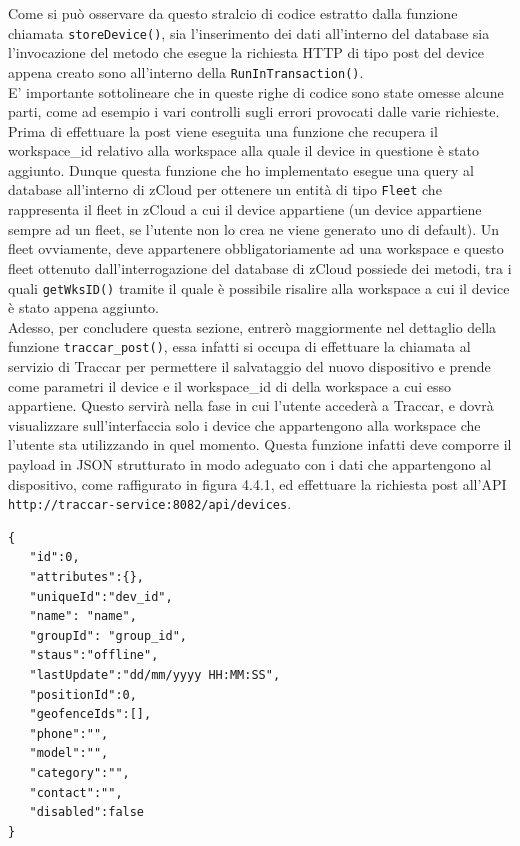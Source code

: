 \documentclass[a4paper,titlepage,12pt]{report}
\begin{document}
{\begin{verbatim}
\end{verbatim}


\noindent Come si può osservare da questo stralcio di codice estratto dalla funzione chiamata \texttt{storeDevice()}, sia l'inserimento dei dati all'interno del database sia l'invocazione del metodo che esegue la richiesta HTTP di tipo post del device appena creato sono all'interno della \texttt{RunInTransaction()}.\\
E' importante sottolineare che in queste righe di codice sono state omesse alcune parti, come ad esempio i vari controlli sugli errori provocati dalle varie richieste.\\
Prima di effettuare la post viene eseguita una funzione che recupera il workspace\_id relativo alla workspace alla quale il device in questione è stato aggiunto. Dunque questa funzione che ho implementato esegue una query al database all'interno di zCloud per ottenere un entità di tipo \texttt{Fleet} che rappresenta il fleet in zCloud a cui il device appartiene (un device appartiene sempre ad un fleet, se l'utente non lo crea ne viene generato uno di default). Un fleet ovviamente, deve appartenere obbligatoriamente ad una workspace e questo fleet ottenuto dall'interrogazione del database di zCloud possiede dei metodi, tra i quali \texttt{getWksID()} tramite il quale è possibile risalire alla workspace a cui il device è stato appena aggiunto.\\
Adesso, per concludere questa sezione, entrerò maggiormente nel dettaglio della funzione \texttt{traccar\_post()}, essa infatti si occupa di effettuare la chiamata al servizio di Traccar per permettere il salvataggio del nuovo dispositivo e prende come parametri il device e il workspace\_id di della workspace a cui esso appartiene. Questo servirà nella fase in cui l'utente accederà a Traccar, e dovrà visualizzare sull'interfaccia solo i device che appartengono alla workspace che l'utente sta utilizzando in quel momento. Questa funzione infatti deve comporre il payload in JSON strutturato in modo adeguato con i dati che appartengono al dispositivo, come raffigurato in figura 4.4.1, ed effettuare la richiesta post all'API \texttt{http://traccar-service:8082/api/devices}.


\begin{verbatim}
{
   "id":0,
   "attributes":{},
   "uniqueId":"dev_id",
   "name": "name",
   "groupId": "group_id",
   "staus":"offline",
   "lastUpdate":"dd/mm/yyyy HH:MM:SS",
   "positionId":0,
   "geofenceIds":[],
   "phone":"",
   "model":"",
   "category":"",
   "contact":"",
   "disabled":false
}


\end{verbatim}}
\end{document}
